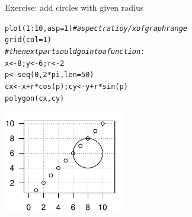 \documentclass[xcolor=table,      handout ,    xcolor=dvipsnames]{beamer}\usepackage[]{graphicx}\usepackage[]{color}
\makeatletter
\newcommand{\hlnum}[1]{\textcolor[rgb]{0,0,0}{#1}}
\newcommand{\hlcom}[1]{\textcolor[rgb]{0,0.392,0}{\textit{#1}}}
\newcommand{\hlopt}[1]{\textcolor[rgb]{0,0,0}{#1}}
\newcommand{\hlstd}[1]{\textcolor[rgb]{0,0,0}{#1}}
\newcommand{\hlkwb}[1]{\textcolor[rgb]{0,0,0}{#1}}
\newcommand{\hlkwc}[1]{\textcolor[rgb]{1,0,1}{#1}}
\newcommand{\hlkwd}[1]{\textcolor[rgb]{0,0,1}{#1}}
\newenvironment{kframe}{%
 \def\at@end@of@kframe{}%
 \ifinner\ifhmode%
  \def\at@end@of@kframe{\end{minipage}}%
  \begin{minipage}{\columnwidth}%
 \fi\fi%
 \def\FrameCommand##1{\hskip\@totalleftmargin \hskip-\fboxsep
 \colorbox{shadecolor}{##1}\hskip-\fboxsep
     \hskip-\linewidth \hskip-\@totalleftmargin \hskip\columnwidth}%
 \MakeFramed {\advance\hsize-\width
   \@totalleftmargin\z@ \linewidth\hsize
   \@setminipage}}%
 {\par\unskip\endMakeFramed%
 \at@end@of@kframe}
\newenvironment{knitrout}{}{} %
\makeatother
\begin{document}

\begin{frame}[fragile]{Exercise: add circles with given radius}
\begin{knitrout}
\color{fgcolor}\begin{kframe}
\begin{alltt}
\hlkwd{plot}\hlstd{(}\hlnum{1}\hlopt{:}\hlnum{10}\hlstd{,} \hlkwc{asp}\hlstd{=}\hlnum{1}\hlstd{)} \hlcom{# aspect ratio y/x of graph range}
\hlkwd{grid}\hlstd{(}\hlkwc{col}\hlstd{=}\hlnum{1}\hlstd{)}
\hlcom{# the next part sould go into a function:}
\hlstd{x} \hlkwb{<-} \hlnum{8} \hlstd{;  y} \hlkwb{<-} \hlnum{6} \hlstd{;  r} \hlkwb{<-}\hlnum{2}
\hlstd{p} \hlkwb{<-} \hlkwd{seq}\hlstd{(}\hlnum{0}\hlstd{,} \hlnum{2}\hlopt{*}\hlstd{pi,} \hlkwc{len}\hlstd{=}\hlnum{50}\hlstd{)}
\hlstd{cx} \hlkwb{<-} \hlstd{x}\hlopt{+}\hlstd{r}\hlopt{*}\hlkwd{cos}\hlstd{(p) ;  cy} \hlkwb{<-} \hlstd{y}\hlopt{+}\hlstd{r}\hlopt{*}\hlkwd{sin}\hlstd{(p)}
\hlkwd{polygon}\hlstd{(cx, cy)}
\end{alltt}
\end{kframe}

{\centering \includegraphics[width=0.4\textwidth]{./fig/circlebasics-1} 

}



\end{knitrout}
\end{frame}

\end{document}
